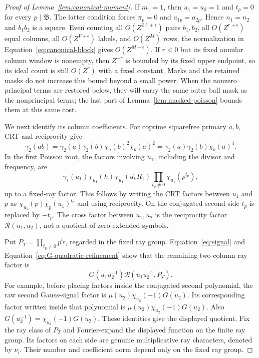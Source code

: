 \documentclass[11pt,a4paper]{article}
\numberwithin{equation}{section}
\numberwithin{figure}{section}
\theoremstyle{definition}
\theoremstyle{remark}
\begin{document}
\begin{proof}[Proof of Lemma~\ref{lem:canonical-moment}]
If \(m_1=1\), then \(u_1=u_2=1\) and \(t_p=0\) for every
\(p\mid\mathfrak B\).  The latter condition forces \(\pi_p=0\)
and \(a_{1p}=a_{2p}\).  Hence \(n_1=n_2\) and \(b_1b_2\) is a
square.  Even counting all \(O(Z^{2\ell+\epsilon})\) pairs \(b_1,b_2\),
all \(O(Z^{r+\epsilon})\) equal columns, all \(O(Z^{V+\epsilon})\)
labels, and \(O(Z^M)\) rows, the normalization in
Equation~\eqref{eq:canonical-block} gives \(O(Z^{M+\epsilon})\).
If \(r<0\) but its fixed annular column window is nonempty, then
\(Z^{-r}\) is bounded by its fixed upper endpoint, so its ideal count
is still \(O(Z^r)\) with a fixed constant.
Marks and the retained masks do not increase this bound beyond a
small power.  When the nonzero principal terms are restored below, they
will carry the same outer ball mask as the nonprincipal terms; the last
part of Lemma~\ref{lem:masked-poisson} bounds them at this same cost.

We next identify its column coefficients.  For coprime squarefree primary \(a,b\),
CRT and reciprocity give
\[
 \gamma_2(ab)=\gamma_2(a)\gamma_2(b)
       \chi_a(b)^2\chi_b(a)^2
 =\gamma_2(a)\gamma_2(b)\chi_b(a)^4.
\]
In the first Poisson root, the factors involving \(u_1\), including
the divisor and frequency, are
\[
 \gamma_1(u_1)\overline{\chi_{u_1}(h)}
 \chi_{u_1}(d_kR_1)\prod_{t_p\ne0}\chi_{u_1}(p^{t_p}),
\]
up to a fixed-ray factor.  This follows by writing the CRT factors
between \(u_1\) and \(p\) as
\(\chi_{u_1}(p)\chi_p(u_1)^{t_p}\) and using reciprocity.  On the
conjugated second side \(t_p\) is replaced by \(-t_p\).  The cross
factor between \(u_1,u_2\) is the reciprocity factor
\(\mathcal R(u_1,u_2)\), not a quotient of zero-extended symbols.

Put \(P_T=\prod_{t_p\ne0}p^{t_p}\), regarded in the fixed ray group.
Equation~\eqref{eq:signal} and
Equation~\eqref{eq:G-quadratic-refinement} show that the remaining
two-column ray factor is
\[
 G(u_1u_2^{-1})\mathcal R(u_1u_2^{-1},P_T).
\]
For example, before placing factors inside the conjugated second
polynomial, the raw second Gauss-signal factor is
\(\mu(u_2)\chi_{u_2}(-1)\overline{G(u_2)}\).  Its corresponding
factor written inside that polynomial is
\(\mu(u_2)\chi_{u_2}(-1)G(u_2)\).  Also
\(G(u_2^{-1})=\chi_{u_2}(-1)\overline{G(u_2)}\).
These identities give the displayed quotient.  Fix the ray class of
\(P_T\) and Fourier-expand the displayed function on the finite ray
group.  Its factors on each side are genuine multiplicative ray
characters, denoted by \(\nu_i\).  Their number and coefficient norm
depend only on the fixed ray group.


\end{proof}
\end{document}
